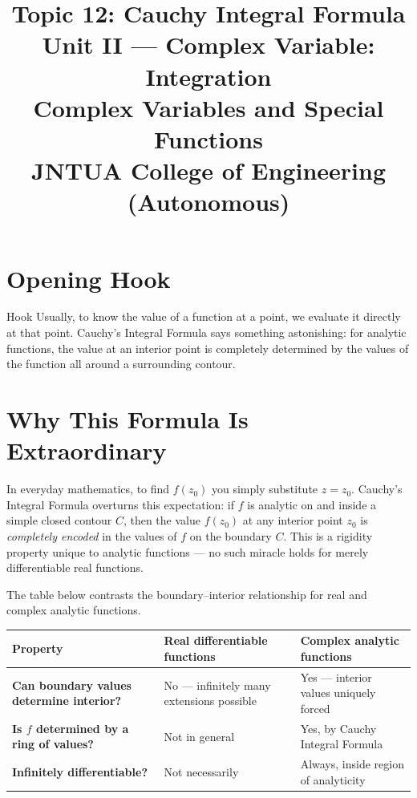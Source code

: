\documentclass[12pt,a4paper]{article}
\title{\textbf{Topic 12: Cauchy Integral Formula}\\
\large Unit II --- Complex Variable: Integration\\
Complex Variables and Special Functions\\
JNTUA College of Engineering (Autonomous)}
\author{}
\date{}
\begin{document}
\maketitle
\tableofcontents
\newpage

\section{Opening Hook}

\begin{curiositybox}{Hook}
Usually, to know the value of a function at a point, we evaluate it directly at that point.
Cauchy's Integral Formula says something astonishing: for analytic functions, the value at
an interior point is completely determined by the values of the function all around a
surrounding contour.
\end{curiositybox}

\section{Why This Formula Is Extraordinary}

In everyday mathematics, to find $f(z_0)$ you simply substitute $z = z_0$.
Cauchy's Integral Formula overturns this expectation: if $f$ is analytic on and
inside a simple closed contour $C$, then the value $f(z_0)$ at any interior point
$z_0$ is \emph{completely encoded} in the values of $f$ on the boundary $C$.
This is a rigidity property unique to analytic functions --- no such miracle
holds for merely differentiable real functions.

\medskip

The table below contrasts the boundary--interior relationship for real and
complex analytic functions.

\begin{center}
\begin{tabular}{>{\bfseries}p{4.5cm} p{5.5cm} p{5.5cm}}
\toprule
Property & Real differentiable functions & Complex analytic functions \\
\midrule
Can boundary values determine interior? & No --- infinitely many extensions possible &
Yes --- interior values uniquely forced \\
Is $f$ determined by a ring of values? & Not in general &
Yes, by Cauchy Integral Formula \\
Infinitely differentiable? & Not necessarily &
Always, inside region of analyticity \\
\bottomrule
\end{tabular}
\end{center}
\end{document}
